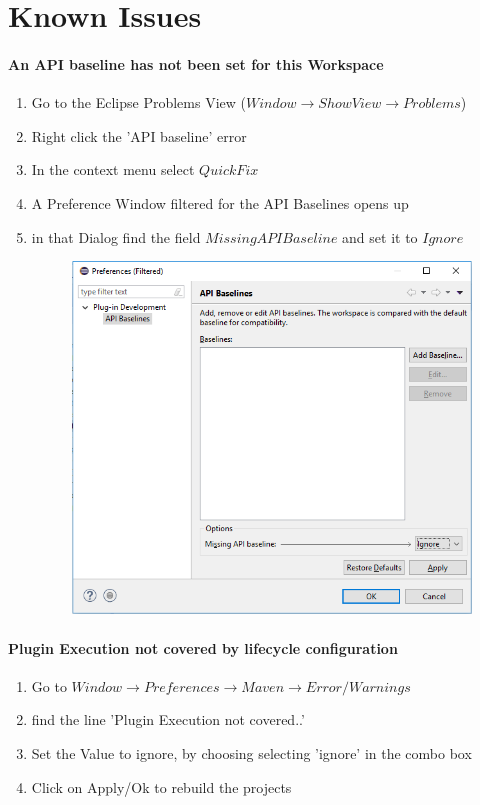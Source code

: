 \section{Known Issues}
\label{chap:issues}
\paragraph{An API baseline has not been set for this Workspace}
\begin{enumerate}
\item Go to the Eclipse Problems View ($Window\rightarrow Show View\rightarrow Problems$)
\item Right click the 'API baseline' error 
\item In the context menu select $Quick Fix$
\item A Preference Window filtered for the API Baselines opens up
\item in that Dialog find the field $Missing API Baseline$ and set it to $Ignore$
\begin{figure}[H]
\includegraphics[scale=0.5]{images/ignoreAPIError.png}

\end{figure}
\end{enumerate}
\paragraph{Plugin Execution not covered by lifecycle configuration} 
\begin{enumerate}
\item Go to $Window\rightarrow Preferences\rightarrow Maven\rightarrow Error/Warnings$
\item find the line 'Plugin Execution not covered..'
\item Set the Value to ignore, by choosing selecting 'ignore' in the combo box
\item Click on Apply/Ok to rebuild the projects
\end{enumerate} 
